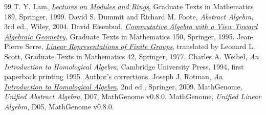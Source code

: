 \documentclass[11pt,oneside,openany]{book}
\theoremstyle{definition}
\theoremstyle{remark}
\begin{document}
\backmatter
\begin{thebibliography}{99}
 T. Y. Lam, \href{https://doi.org/10.1007/978-1-4612-0525-8}{\emph{Lectures on Modules and Rings}}, Graduate Texts in Mathematics 189, Springer, 1999.
 David S. Dummit and Richard M. Foote, \emph{Abstract Algebra}, 3rd ed., Wiley, 2004.
 David Eisenbud, \href{https://doi.org/10.1007/978-1-4612-5350-1}{\emph{Commutative Algebra with a View Toward Algebraic Geometry}}, Graduate Texts in Mathematics 150, Springer, 1995.
 Jean-Pierre Serre, \href{https://doi.org/10.1007/978-1-4684-9458-7}{\emph{Linear Representations of Finite Groups}}, translated by Leonard L. Scott, Graduate Texts in Mathematics 42, Springer, 1977.
 Charles A. Weibel, \emph{An Introduction to Homological Algebra}, Cambridge University Press, 1994, first paperback printing 1995. \href{https://sites.math.rutgers.edu/~weibel/Hbook-corrections.html}{Author's corrections}.
 Joseph J. Rotman, \href{https://doi.org/10.1007/b98977}{\emph{An Introduction to Homological Algebra}}, 2nd ed., Springer, 2009.
 MathGenome, \emph{Unified Abstract Algebra}, D07, MathGenome v0.8.0.
 MathGenome, \emph{Unified Linear Algebra}, D05, MathGenome v0.8.0.
\end{thebibliography}
\end{document}
